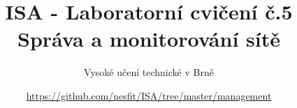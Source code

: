 \documentclass[a4paper,11pt]{article}
\title{ISA - Laboratorní cvičení č.5\\
{\bf\large Správa a monitorování sítě}}
\author{Vysoké učení technické v Brně}
\date{\url{https://github.com/nesfit/ISA/tree/master/management}}
\begin{document}
{\let\newpage\relax\maketitle}


\end{document}

